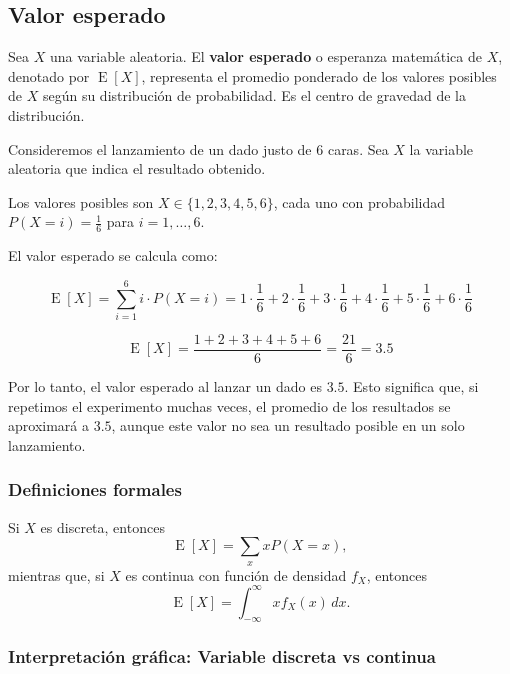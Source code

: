 \documentclass[11pt,a4paper]{article}
\DeclareMathOperator{\E}{E}
\begin{document}
\subsection{Valor esperado}

\begin{concepto}
Sea \(X\) una variable aleatoria. El \textbf{valor esperado} o esperanza matemática de \(X\), denotado por \(\E[X]\), representa el promedio ponderado de los valores posibles de \(X\) según su distribución de probabilidad. Es el centro de gravedad de la distribución.
\end{concepto}

\begin{ejemplo}
Consideremos el lanzamiento de un dado justo de 6 caras. Sea \(X\) la variable aleatoria que indica el resultado obtenido.

Los valores posibles son \(X \in \{1,2,3,4,5,6\}\), cada uno con probabilidad \(P(X=i) = \frac{1}{6}\) para \(i=1,\dots,6\).

El valor esperado se calcula como:

\[
\E[X] = \sum_{i=1}^{6} i \cdot P(X=i) = 1\cdot\frac{1}{6} + 2\cdot\frac{1}{6} + 3\cdot\frac{1}{6} + 4\cdot\frac{1}{6} + 5\cdot\frac{1}{6} + 6\cdot\frac{1}{6}
\]

\[
\E[X] = \frac{1+2+3+4+5+6}{6} = \frac{21}{6} = 3.5
\]

Por lo tanto, el valor esperado al lanzar un dado es \(3.5\). Esto significa que, si repetimos el experimento muchas veces, el promedio de los resultados se aproximará a \(3.5\), aunque este valor no sea un resultado posible en un solo lanzamiento.
\end{ejemplo}

\subsubsection*{Definiciones formales}

Si \(X\) es discreta, entonces
\[
\boxed{\E[X]=\sum_x xP(X=x)},
\]
mientras que, si \(X\) es continua con función de densidad \(f_X\), entonces
\[
\boxed{\E[X]=\int_{-\infty}^{\infty}xf_X(x)\,dx}.
\]

\subsubsection*{Interpretación gráfica: Variable discreta vs continua}
\end{document}
